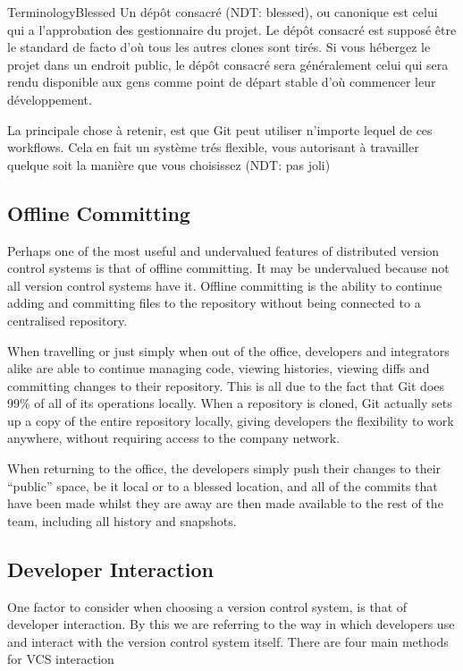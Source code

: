 \begin{callout}{Terminology}{Blessed}
Un dépôt consacré (NDT: blessed), ou canonique est celui qui a l'approbation des gestionnaire du projet.
Le dépôt consacré est supposé être le standard de facto d'où tous les autres clones sont tirés.
Si vous hébergez le projet dans un endroit public, le dépôt consacré sera généralement celui qui sera rendu disponible aux gens comme point
de départ stable d'où commencer leur développement.
\end{callout}

La principale chose à retenir, est que Git peut utiliser n'importe lequel de ces workflows.
Cela en fait un système trés flexible, vous autorisant à travailler quelque soit la manière que vous choisissez (NDT: pas joli)

\subsection{Offline Committing}
Perhaps one of the most useful and undervalued features of distributed version control systems is that of offline committing.
It may be undervalued because not all version control systems have it.
Offline committing is the ability to continue adding and committing files to the repository without being connected to a centralised repository.

When travelling or just simply when out of the office, developers and integrators alike are able to continue managing code, viewing histories, viewing diffs and committing changes to their repository.
This is all due to the fact that Git does 99\% of all of its operations locally.
When a repository is cloned, Git actually sets up a copy of the entire repository locally, giving developers the flexibility to work anywhere, without requiring access to the company network.

When returning to the office, the developers simply push their changes to their ``public'' space, be it local or to a blessed location, and all of the commits that have been made whilst they are away are then made available to the rest of the team, including all history and snapshots.

\subsection{Developer Interaction}
One factor to consider when choosing a version control system, is that of developer interaction.
By this we are referring to the way in which developers use and interact with the version control system itself.
There are four main methods for VCS interaction

